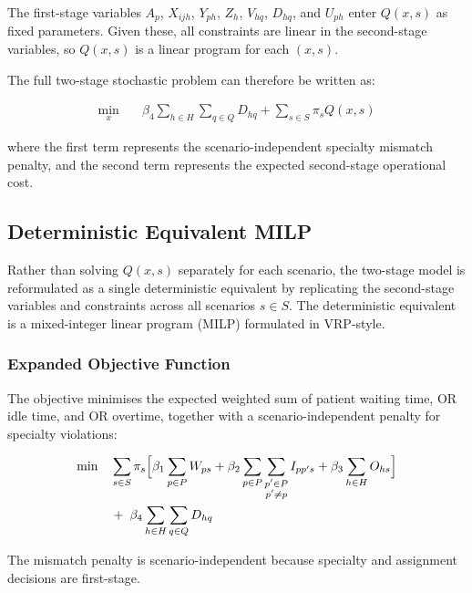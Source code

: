 \noindent The first-stage variables $A_p$, $X_{ijh}$, $Y_{ph}$, $Z_h$,
$V_{hq}$, $D_{hq}$, and $U_{ph}$ enter $Q(x,s)$ as fixed parameters. Given
these, all constraints are linear in the second-stage variables, so $Q(x, s)$
is a linear program for each $(x, s)$.

The full two-stage stochastic problem can therefore be written as:

\begin{align}
  \min_x \quad
    & \beta_4 \sum_{h \in H} \sum_{q \in Q} D_{hq}
    + \sum_{s \in S} \pi_s Q(x, s)
  \label{eq:two_stage_obj}
\end{align}

where the first term represents the scenario-independent specialty mismatch
penalty, and the second term represents the expected second-stage operational
cost.

\subsection{Deterministic Equivalent MILP}

Rather than solving $Q(x,s)$ separately for each scenario, the two-stage
model is reformulated as a single deterministic equivalent by replicating
the second-stage variables and constraints across all scenarios $s \in S$.
The deterministic equivalent is a mixed-integer linear program (MILP) formulated in VRP-style.

\subsubsection{Expanded Objective Function}

The objective minimises the expected weighted sum of patient waiting time, OR
idle time, and OR overtime, together with a scenario-independent penalty for
specialty violations:

\begin{align}
  \min \quad
    & \sum_{s \in S} \pi_s \Bigl[
        \beta_1 \sum_{p \in P} W_{ps}
      + \beta_2 \sum_{p \in P}\sum_{\substack{p' \in P \\ p' \neq p}} I_{pp's}
      + \beta_3 \sum_{h \in H} O_{hs}
      \Bigr] \nonumber \\
    & + \; \beta_4 \sum_{h \in H} \sum_{q \in Q} D_{hq}
  \label{eq:obj}
\end{align}

The mismatch penalty is scenario-independent because specialty and assignment
decisions are first-stage.

